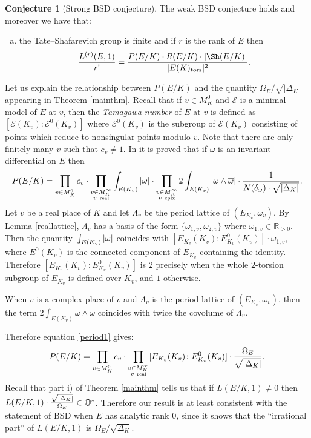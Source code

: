 \documentclass[11pt]{amsart}
\theoremstyle{definition}
\newtheorem{conj}[definizione]{Conjecture}
\begin{document}
			\begin{conj}[Strong BSD conjecture]
				The weak BSD conjecture holds and moreover we have that:
					\begin{enumerate}[c)]
						\item the Tate--Shafarevich group is finite and if $r$ is the rank of $E$ then
							$$\frac{L^{(r)}(E,1)}{r!}=\frac{P(E/K)\cdot R(E/K)\cdot |\Sh(E/K)|}{|E(K)_{\text{tors}}|^2}.$$
				\end{enumerate}
		\end{conj}
		Let us explain the relationship between $P(E/K)$ and the quantity $\Omega_E/\sqrt{|\Delta_K|}$ appearing in Theorem \ref{mainthm}. Recall that if $v\in M^0_K$ and $\mathcal E$ is a minimal model of $E$ at $v$, then the \emph{Tamagawa number} of $E$ at $v$ is defined as $[\mathcal E(K_v)\colon \mathcal E^0(K_v)]$ where $\mathcal E^0(K_v)$ is the subgroup of $\mathcal E(K_v)$ consisting of points which reduce to nonsingular points modulo $v$. Note that there are only finitely many $v$ such that $c_v\neq 1$. In \cite[pp. 92-96]{lang} it is proved that if $\omega$ is an invariant differential on $E$ then
		\begin{equation}\label{period1}
		P(E/K)=\prod_{v\in M^0_K}c_v\cdot \prod_{\substack{v\in M_K^{\infty}\\v\mbox{ \tiny real}} }\int_{E(K_v)}|\omega|\cdot\prod_{\substack{v\in M_K^{\infty}\\v\mbox{ \tiny cplx}} }2\int_{E(K_v)}|\omega\wedge\overline{\omega}|\cdot\frac{1}{N(\delta_{\omega})\cdot\sqrt{|\Delta_K|}}.
		\end{equation}
 		Let $v$ be a real place of $K$ and let $\Lambda_v$ be the period lattice of $(E_{K_v},\omega_v)$. By Lemma \ref{reallattice}, $\Lambda_v$ has a basis of the form $\{\omega_{1,v},\omega_{2,v}\}$ where $\omega_{1,v}\in {\mathbb{R}}_{>0}$. Then the quantity ${\displaystyle} \int_{E(K_v)}|\omega|$ coincides with $[E_{K_v}(K_v)\colon E^0_{K_v}(K_v)]\cdot \omega_{1,v}$, where $E^0(K_v)$ is the connected component of $E_{K_v}$ containing the identity. Therefore $[E_{K_v}(K_v)\colon E^0_{K_v}(K_v)]$ is $2$ precisely when the whole $2$-torsion subgroup of $E_{K_v}$ is defined over $K_v$, and $1$ otherwise.

		When $v$ is a complex place of $v$ and $\Lambda_v$ is the period lattice of $(E_{K_v},\omega_v)$, then the term $2\int_{E(K_v)}\omega\wedge\overline{\omega}$ coincides with twice the covolume of $\Lambda_v$.
		
		Therefore equation \eqref{period1} gives:
		$$P(E/K)=\prod_{v\in M^0_K}c_v\cdot \prod_{\substack{v\in M_K^{\infty}\\v\mbox{ \tiny real}} }[E_{K_v}(K_v)\colon E^0_{K_v}(K_v)]\cdot \frac{\Omega_E}{\sqrt{|\Delta_K|}}.$$
		Recall that part i) of Theorem \ref{mainthm} tells us that if $L(E/K,1)\neq 0$ then ${\displaystyle} L(E/K,1)\cdot\frac{\sqrt{|\Delta_K|}}{\Omega_E}\in {\mathbb{Q}}^*$. Therefore our result is at least consistent with the statement of BSD when $E$ has analytic rank $0$, since it shows that the ``irrational part'' of $L(E/K,1)$ is $\Omega_E/\sqrt{\Delta_K}$.
\end{document}
